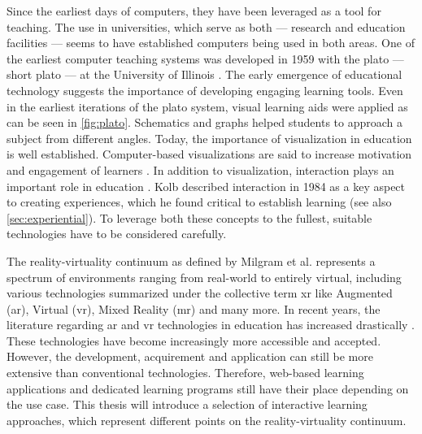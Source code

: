 Since the earliest days of computers, they have been leveraged as a tool for teaching.
The use in universities, which serve as both --- research and education facilities --- seems to have established computers being used in both areas.
One of the earliest computer teaching systems was developed in 1959 with the \acrlong{plato} --- short \acrshort{plato} --- at the University of Illinois \cite{cope2023history}.
The early emergence of educational technology suggests the importance of developing engaging learning tools.
Even in the earliest iterations of the \acrshort{plato} system, visual learning aids were applied as can be seen in \autoref{fig:plato}.
Schematics and graphs helped students to approach a subject from different angles.
Today, the importance of visualization in education is well established.
Computer-based visualizations are said to increase motivation and engagement of learners \cite{vavra2011visualization}.
In addition to visualization, interaction plays an important role in education \cite{firat2018towards}.
Kolb described interaction in 1984 \cite{kolb:1984:experiential} as a key aspect to creating experiences, which he found critical to establish learning (see also \autoref{sec:experiential}).
To leverage both these concepts to the fullest, suitable technologies have to be considered carefully.

The reality-virtuality continuum as defined by Milgram et al. \cite{milgram1994arc} represents a spectrum of environments ranging from real-world to entirely virtual, including various technologies summarized under the collective term \acrfull{xr} like Augmented (\acrshort{ar}), Virtual (\acrshort{vr}), Mixed Reality (\acrshort{mr}) and many more.
In recent years, the literature regarding \acrshort{ar} and \acrshort{vr} technologies in education has increased drastically \cite{alansi2023analyzing}.
These technologies have become increasingly more accessible and accepted.
However, the development, acquirement and application can still be more extensive than conventional technologies.
Therefore, web-based learning applications and dedicated learning programs still have their place depending on the use case.
This thesis will introduce a selection of interactive learning approaches, which represent different points on the reality-virtuality continuum. 

